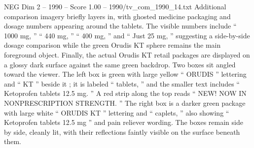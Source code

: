 \begin{textsample}{NEG Dim 2 – 1990 – Score 1.00 – 1990/tv\_com\_1990\_14.txt}
Additional comparison imagery briefly layers in, with ghosted medicine packaging and dosage numbers appearing around the tablets.
The visible numbers include “ 1000 mg, ” “ 440 mg, ” “ 400 mg, ” and “ Just 25 mg, ” suggesting a side-by-side dosage comparison while the green Orudis KT sphere remains the main foreground object.
Finally, the actual Orudis KT retail packages are displayed on a glossy dark surface against the same green backdrop.
Two boxes sit angled toward the viewer.
The left box is green with large yellow “ ORUDIS ” lettering and “ KT ” beside it ; it is labeled “ tablets, ” and the smaller text includes “ Ketoprofen tablets 12.5 mg. ” A red strip along the top reads “ NEW!
NOW IN NONPRESCRIPTION STRENGTH. ” The right box is a darker green package with large white “ ORUDIS KT ” lettering and “ caplets, ” also showing “ Ketoprofen tablets 12.5 mg ” and pain reliever wording.
The boxes remain side by side, cleanly lit, with their reflections faintly visible on the surface beneath them.

\end{textsample}
